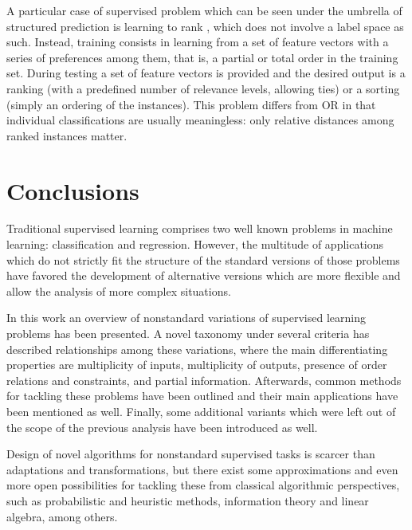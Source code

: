 A particular case of supervised problem which can be seen under the umbrella of structured prediction is learning to rank \cite{ltr}, which does not involve a label space as such. Instead, training consists in learning from a set of feature vectors with a series of preferences among them, that is, a partial or total order in the training set. During testing a set of feature vectors is provided and the desired output is a ranking (with a predefined number of relevance levels, allowing ties) or a sorting (simply an ordering of the instances). This problem differs from OR in that individual classifications are usually meaningless: only relative distances among ranked instances matter.

\section{Conclusions}
\label{p3sec:conclusions}

Traditional supervised learning comprises two well known problems in machine learning: classification and regression. However, the multitude of applications which do not strictly fit the structure of the standard versions of those problems have favored the development of alternative versions which are more flexible and allow the analysis of more complex situations. 

In this work an overview of nonstandard variations of supervised learning problems has been presented. A novel taxonomy under several criteria has described relationships among these variations, where the main differentiating properties are multiplicity of inputs, multiplicity of outputs, presence of order relations and constraints, and partial information. Afterwards, common methods for tackling these problems have been outlined and their main applications have been mentioned as well. Finally, some additional variants which were left out of the scope of the previous analysis have been introduced as well.

Design of novel algorithms for nonstandard supervised tasks is scarcer than adaptations and transformations, but there exist some approximations and even more open possibilities for tackling these from classical algorithmic perspectives, such as probabilistic and heuristic methods, information theory and linear algebra, among others. 



